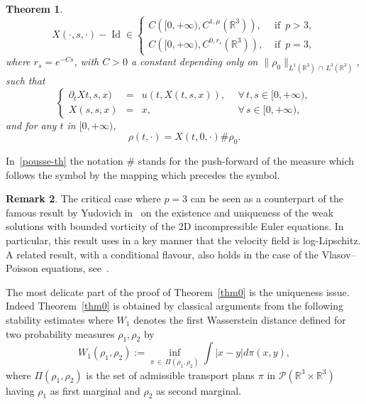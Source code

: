 \documentclass[10pt]{amsart}
\newtheorem{theo}{Theorem}[section]
\theoremstyle{definition}\newtheorem{defi}[theo]{Definition}\newtheorem{rema}[theo]{Remark}\newtheorem{exam}[theo]{Example}\newtheorem{exem}[theo]{Example}\newtheorem{nota}[theo]{Notation}
\newcommand{\R}{\mathbb{R}}
\newcommand{\clP}{\mathcal{P}}
\newcommand{\Id}{\operatorname{Id}}
\let\oldforall\forall
\renewcommand*{\forall}{\mathrel{\oldforall}}
\begin{document}
\begin{theo}
\begin{equation}\label{uflox}
X(\cdot,s,\cdot)-\Id \in
\begin{cases}
C\left([0,+\infty), C^{1,\mu} \left(\R^3\right)\right), & \text{ if } \, p > 3,
\\ {C\left([0,+\infty), C^{0,r_s} \left(\R^3\right)\right),} & \text{ if } \, p =3,
\end{cases}
\end{equation}
where $r_s = e^{-Cs} $, with $C>0$ a constant depending only on $\|\rho_0\|_{L^1(\R^3)\,\cap\,L^3(\R^3)}$, such that
\begin{equation}\label{cflow-def}
\left \{
\begin{array}{rcll}
\partial_t Xt,s,x) & = & u(t, X(t,s,x)),&\: \: \forall \, t,s\in[0,+\infty), \\
X(s,s,x) & = & x,& \: \: \forall \, s \in [0,+\infty),
\end{array}
\right.
\end{equation}
and for any $t$ in $[0,+\infty)$,
\begin{equation}\label{pousse-th}
\rho(t,\cdot) =X(t,0,\cdot) \#\rho_0.
\end{equation}
\end{theo}

In~\eqref{pousse-th} the notation $\#$ stands for the push-forward of the measure which follows the symbol by the mapping which precedes the symbol.


\begin{rema}\label{analog}
The critical case where $p=3$ can be seen as a counterpart of the famous result by Yudovich in~\cite{Yudovich63} on the existence and uniqueness of the weak solutions with bounded vorticity of the 2D incompressible Euler equations. In particular, this result uses in a key manner that the velocity field is log-Lipschitz. A related result, with a conditional flavour, also holds in the case of the Vlasov--Poisson equations, see~\cite{Loeper}.
\end{rema} The most delicate part of the proof of Theorem~\ref{thm0} is the uniqueness issue. Indeed Theorem~\ref{thm0} is obtained by classical arguments from the following stability estimates where $W_1$ denotes the first Wasserstein distance defined for two probability measures $\rho_1,\rho_2 $ by
\[
W_1 (\rho_1,\rho_2) :=
\underset{\pi\,\in\,\Pi(\rho_1,\rho_2)} \inf \int |x-y| d\pi(x,y),
\]
where $\Pi(\rho_1,\rho_2)$ is the set of admissible transport plans $\pi $ in $\clP(\R^3\times \R^3)$ having $\rho_1$ as first marginal and $\rho_2$ as second marginal.
\end{document}
